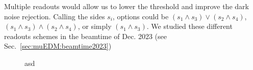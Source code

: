 \begin{refsection}
            Multiple readouts would allow us to lower the threshold and improve the dark noise rejection. Calling the sides $s_i$, options could be $(s_1\land s_3)\lor(s_2\land s_4)$, $(s_1\land s_3)\land(s_2\land s_4)$, or simply $(s_1\land s_3)$.
            We studied these different readouts schemes in the beamtime of Dec. 2023 (see Sec.~\ref{sec:muEDM:beamtime2023}) 
            \begin{figure}   
                \centering
                \hfill
                \caption{asd}
                \label{fig:muEDM:entrance:guide}
            \end{figure}
    

\end{refsection}

